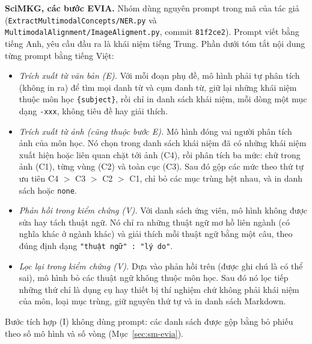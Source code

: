 \textbf{SciMKG, các bước EVIA.} Nhóm dùng nguyên prompt trong mã của tác giả (\texttt{ExtractMultimodalConcepts/NER.py} và \texttt{MultimodalAlignment/ImageAligment.py}, commit \texttt{81f2ce2}). Prompt viết bằng tiếng Anh, yêu cầu đầu ra là khái niệm tiếng Trung. Phần dưới tóm tắt nội dung từng prompt bằng tiếng Việt:
\begin{itemize}
\item \emph{Trích xuất từ văn bản (E).} Với mỗi đoạn phụ đề, mô hình phải tự phân tích (không in ra) để tìm mọi danh từ và cụm danh từ, giữ lại những khái niệm thuộc môn học \texttt{\{subject\}}, rồi chỉ in danh sách khái niệm, mỗi dòng một mục dạng \texttt{-xxx}, không tiêu đề hay giải thích.
\item \emph{Trích xuất từ ảnh (cũng thuộc bước E).} Mô hình đóng vai người phân tích ảnh của môn học. Nó chọn trong danh sách khái niệm đã có những khái niệm xuất hiện hoặc liên quan chặt tới ảnh (C4), rồi phân tích ba mức: chữ trong ảnh (C1), từng vùng (C2) và toàn cục (C3). Sau đó gộp các mức theo thứ tự ưu tiên C4 $>$ C3 $>$ C2 $>$ C1, chỉ bỏ các mục trùng hệt nhau, và in danh sách hoặc \texttt{none}.
\item \emph{Phản hồi trong kiểm chứng (V).} Với danh sách ứng viên, mô hình không được sửa hay tách thuật ngữ. Nó chỉ ra những thuật ngữ mơ hồ liên ngành (có nghĩa khác ở ngành khác) và giải thích mỗi thuật ngữ bằng một câu, theo đúng định dạng \texttt{"thuật ngữ" : "lý do"}.
\item \emph{Lọc lại trong kiểm chứng (V).} Dựa vào phản hồi trên (được ghi chú là có thể sai), mô hình bỏ các thuật ngữ không thuộc môn học. Sau đó nó lọc tiếp những thứ chỉ là dụng cụ hay thiết bị thí nghiệm chứ không phải khái niệm của môn, loại mục trùng, giữ nguyên thứ tự và in danh sách Markdown.
\end{itemize}
Bước tích hợp (I) không dùng prompt: các danh sách được gộp bằng bỏ phiếu theo số mô hình và số vòng (Mục~\ref{sec:sm-evia}).

